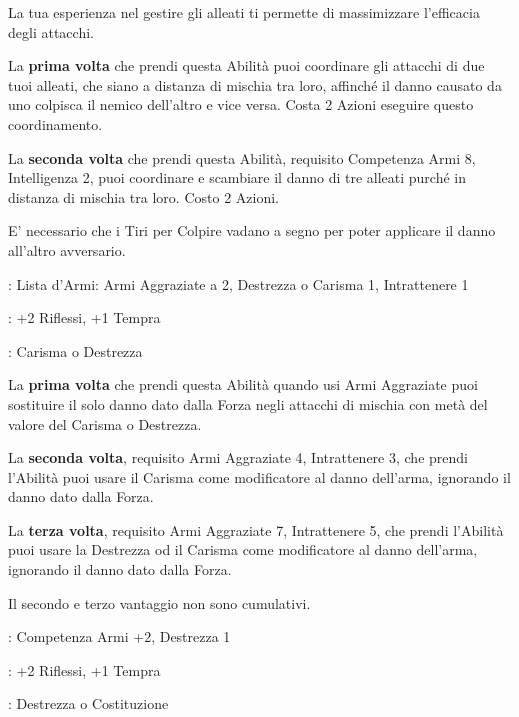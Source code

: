 \begin{multicols}{2}
La tua esperienza nel gestire gli alleati ti permette di massimizzare l'efficacia degli attacchi.

La \textbf{prima volta} che prendi questa Abilità puoi coordinare gli attacchi di due tuoi alleati, che siano a distanza di mischia tra loro, affinché il danno causato da uno colpisca il nemico dell'altro e vice versa. Costa 2 Azioni eseguire questo coordinamento.

La \textbf{seconda volta} che prendi questa Abilità, requisito Competenza Armi 8, Intelligenza 2, puoi coordinare e scambiare il danno di tre alleati purché in distanza di mischia tra loro. Costo 2 Azioni.

E' necessario che i Tiri per Colpire vadano a segno per poter applicare il danno all'altro avversario.

\begin{description}[noitemsep, topsep=0pt, parsep=0pt, partopsep=0pt, leftmargin=0cm, labelwidth=2.5cm]
    \item[\textbf{Requisito}]: Lista d'Armi: Armi Aggraziate a 2, Destrezza o Carisma 1, Intrattenere 1
    \item[\textbf{Tiri Salvezza}]: +2 Riflessi, +1 Tempra
    \item[\textbf{Caratteristica}]: Carisma o Destrezza
\end{description}

La \textbf{prima volta} che prendi questa Abilità quando usi Armi Aggraziate puoi sostituire il solo danno dato dalla Forza negli attacchi di mischia con metà del valore del Carisma o Destrezza.

La \textbf{seconda volta}, requisito Armi Aggraziate 4, Intrattenere 3, che prendi l'Abilità puoi usare il Carisma come modificatore al danno dell'arma, ignorando il danno dato dalla Forza.

La \textbf{terza volta}, requisito Armi Aggraziate 7, Intrattenere 5, che prendi l'Abilità puoi usare la Destrezza od il Carisma come modificatore al danno dell'arma, ignorando il danno dato dalla Forza.

Il secondo e terzo vantaggio non sono cumulativi.

\begin{description}[noitemsep, topsep=0pt, parsep=0pt, partopsep=0pt, leftmargin=0cm, labelwidth=2.5cm]
    \item[\textbf{Requisito}]: Competenza Armi +2, Destrezza 1
    \item[\textbf{Tiri Salvezza}]: +2 Riflessi, +1 Tempra
    \item[\textbf{Caratteristica}]: Destrezza o Costituzione
\end{description}


\end{multicols}
